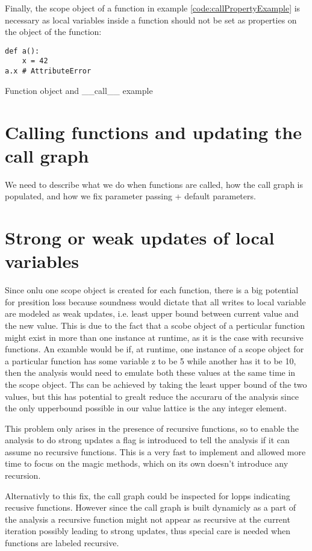 Finally, the scope object of a function in example \ref{code:callPropertyExample} is necessary as local variables inside a function should not be set as properties on the object of the function:

\begin{listing}[H]
	\begin{verbatim}
def a(): 
	x = 42
a.x # AttributeError
	\end{verbatim}
\caption{Function object and \_\_call\_\_ example}\label{code:callPropertyExample}
\end{listing}


\section{Calling functions and updating the call graph}
We need to describe what we do when functions are called, how the call graph is populated, and how we fix parameter passing + default parameters.

\section{Strong or weak updates of local variables}
Since onlu one scope object is created for each function, there is a big potential for presition loss because soundness would dictate that all writes to local variable are modeled as weak updates, i.e. least upper bound between current value and the new value. This is due to the fact that a scobe object of a perticular function might exist in more than one instance at runtime, as it is the case with recursive functions. An examble would be if, at runtime, one instance of a scope object for a particular function has some variable z to be 5 while another has it to be 10, then the analysis would need to emulate both these values at the same time in the scope object. Ths can be achieved by taking the least upper bound of the two values, but this has potential to grealt reduce the accuraru of the analysis since the only upperbound possible in our value lattice is the any integer element.

This problem only arises in the presence of recursive functions, so to enable the analysis to do strong updates a flag is introduced to tell the analysis if it can assume no recursive functions. This is a very fast to implement and allowed more time to focus on the magic methods, which on its own doesn't introduce any recursion.

Alternativly to this fix, the call graph could be inspected for lopps indicating recusive functions. However since the call graph is built dynamicly as a part of the analysis a recursive function might not appear as recursive at the current iteration possibly leading to strong updates, thus special care is needed when functions are labeled recursive.

